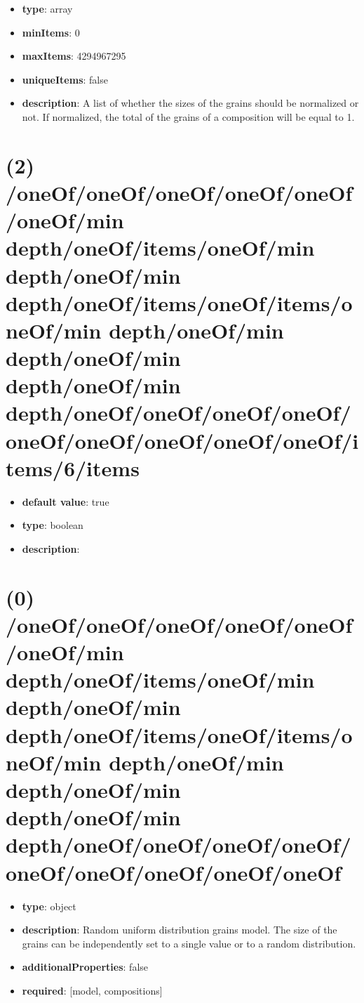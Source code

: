 \begin{itemize}[leftmargin=1em]\item {\bf type}: array
\item {\bf minItems}: 0
\item {\bf maxItems}: 4294967295
\item {\bf uniqueItems}: false
\item {\bf description}: A list of whether the sizes of the grains should be normalized or not. If normalized, the total of the grains of a composition will be equal to 1.
\end{itemize}\section{(2) /oneOf/oneOf/oneOf/oneOf/oneOf/oneOf/min depth/oneOf/items/oneOf/min depth/oneOf/min depth/oneOf/items/oneOf/items/oneOf/min depth/oneOf/min depth/oneOf/min depth/oneOf/min depth/oneOf/oneOf/oneOf/oneOf/oneOf/oneOf/oneOf/oneOf/oneOf/items/6/items}
\begin{itemize}[leftmargin=2em]\item {\bf default value}: true
\item {\bf type}: boolean
\item {\bf description}: 
\end{itemize}\section{(0) /oneOf/oneOf/oneOf/oneOf/oneOf/oneOf/min depth/oneOf/items/oneOf/min depth/oneOf/min depth/oneOf/items/oneOf/items/oneOf/min depth/oneOf/min depth/oneOf/min depth/oneOf/min depth/oneOf/oneOf/oneOf/oneOf/oneOf/oneOf/oneOf/oneOf/oneOf}
\begin{itemize}[leftmargin=0em]\item {\bf type}: object
\item {\bf description}: Random uniform distribution grains model. The size of the grains can be independently set to a single value or to a random distribution.
\item {\bf additionalProperties}: false
\item {\bf required}: [model, compositions]\end{itemize}
